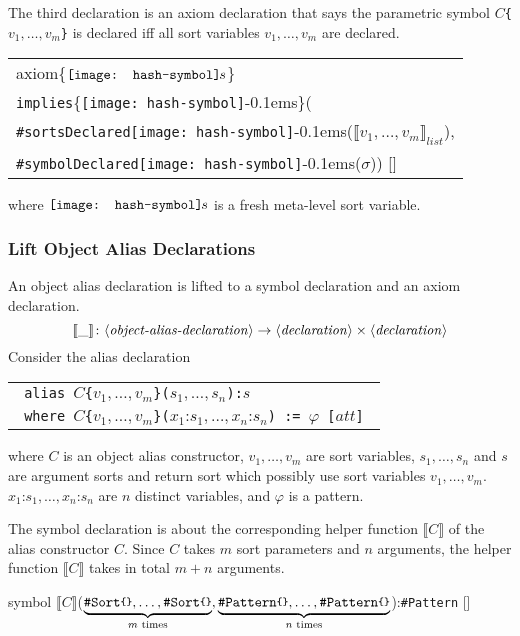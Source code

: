 \documentclass[UTF8,11pt]{article}
\theoremstyle{plain}
\theoremstyle{definition}
\theoremstyle{remark}
\newcommand{\cln}{\texttt{:}}
\newcommand{\parametric}[2]{{#1}\raisebox{.2ex}{\texttt{\footnotesize{\{}}}#2\raisebox{.2ex}{\texttt{\footnotesize{\}}}}}
\newcommand{\denote}[1]{\llbracket{#1}\rrbracket}
\newcommand{\shp}{\texttt{[image: hash-symbol]}\kern-0.1em}
\newcommand{\sharpsymbol}{\#}
\newcommand{\shs}{\shp s}
\newcommand{\KSort}{\texttt{\sharpsymbol Sort}}
\newcommand{\KPattern}{\texttt{\sharpsymbol Pattern}}
\newcommand{\KsortsDeclared}[1]{
        \parametric{\texttt{\sharpsymbol sortsDeclared}}{#1}}
\newcommand{\KsymbolDeclared}[1]{
  	\parametric{\texttt{\sharpsymbol symbolDeclared}}{#1}}
\newcommand{\llist}{\mathit{list}}
\newcommand{\slashsymbol}{\symbol{92}}
\newcommand{\slsh}[1]{\texttt{\slashsymbol#1}}
\newcommand{\slimplies}{\slsh{implies}}
\newcommand{\syntacc}[1]{\text{$\langle$\textit{#1}$\rangle$}}
\begin{document}
The third declaration is an axiom declaration that says the parametric symbol
\texttt{$C$\{$v_1,\dots,v_m$\}} is declared iff all sort variables 
$v_1,\dots,v_m$ are declared.

\begin{center}
	\begin{tabular}{l}
		\ttfamily
		axiom\{$\shs$\} \\
		\ttfamily
		\qquad 
		\slimplies\{\shs\}( \\
		\ttfamily
		\qquad\qquad\KsortsDeclared{\shs}($\denote{
			v_1,\dots,v_m}_\llist$),\\
		\ttfamily
		\qquad\qquad\KsymbolDeclared{\shs}($\sigma$))
		[]
	\end{tabular}
\end{center}
where $\shs$ is a fresh meta-level sort variable.

\subsubsection{Lift Object Alias Declarations}
An object alias declaration is lifted to a symbol declaration
and an axiom declaration.
$$ \denote{\_} \colon \syntacc{object-alias-declaration} \to 
\syntacc{declaration} \times
\syntacc{declaration}$$
Consider the alias declaration
\begin{center}
\begin{tabular}{l}
\texttt{
alias $C$\{$v_1,\dots,v_m$\}($s_1,\dots,s_n$):$s$
}\\
\texttt{
where $C$\{$v_1,\dots,v_m$\}($x_1 \cln s_1,\dots,x_n \cln s_n$)
:= $\varphi$ [$att$]
}
\end{tabular}
\end{center}
where $C$ is an object alias constructor, $v_1,\dots,v_m$ are sort variables, 
$s_1,\dots,s_n$ and $s$ are argument sorts and return sort which possibly use 
sort variables $v_1,\dots,v_m$.
$x_1 \cln s_1,\dots,x_n \cln s_n$ are $n$ distinct variables, and
$\varphi$ is a pattern.

The symbol declaration is about the corresponding 
helper function $\denote{C}$ of the alias constructor $C$.
Since $C$ takes $m$ sort parameters and $n$ arguments, the helper function 
$\denote{C}$ takes in total $m+n$ arguments.
\begin{center}
	\ttfamily
	symbol $\denote{C}$($\underbrace{\parametric{
			\KSort}{},\dots,\parametric{\KSort}{}}_\textrm{$m$ 
		times},\underbrace{\parametric{
			\KPattern}{},\dots,\parametric{\KPattern}{}}_\textrm{$n$ 
		times}$):\parametric{\KPattern}{}
	[]
\end{center}
\end{document}
